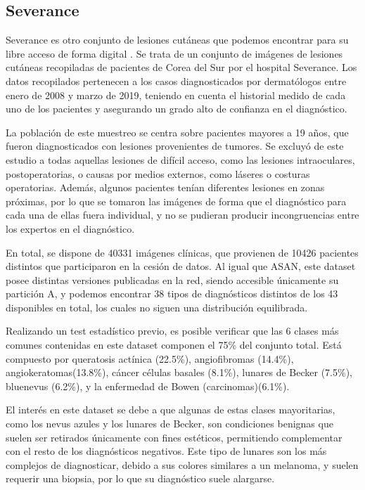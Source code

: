 \subsection{Severance}

Severance es otro conjunto de lesiones cutáneas que podemos encontrar para su libre acceso de forma digital \cite{severance}. Se trata de un conjunto de imágenes de lesiones cutáneas recopiladas de pacientes de Corea del Sur por el hospital Severance.  Los datos recopilados pertenecen a los casos diagnosticados por dermatólogos entre enero de 2008 y marzo de 2019, teniendo en cuenta el historial medido de cada uno de los pacientes y asegurando un grado alto de confianza en el diagnóstico.

La población de este muestreo se centra sobre pacientes mayores a 19 años, que fueron diagnosticados con lesiones provenientes de tumores. Se excluyó de este estudio a todas aquellas lesiones de difícil acceso, como las lesiones intraoculares, postoperatorias, o causas por medios externos, como láseres o costuras operatorias. Además, algunos pacientes tenían diferentes lesiones en zonas próximas, por lo que se tomaron las imágenes de forma que el diagnóstico para cada una de ellas fuera individual, y no se pudieran producir incongruencias entre los expertos en el diagnóstico. 

En total, se dispone de 40331 imágenes clínicas, que provienen de 10426 pacientes distintos que participaron en la cesión de datos. Al igual que ASAN, este dataset posee distintas versiones publicadas en la red, siendo accesible únicamente su partición A, y podemos encontrar 38 tipos de diagnósticos distintos de los 43 disponibles en total,  los cuales no siguen una distribución equilibrada.

Realizando un test estadístico previo, es posible verificar que las 6 clases más comunes contenidas en este dataset componen el 75\% del conjunto total. Está compuesto por queratosis actínica (22.5\%), angiofibromas (14.4\%), angiokeratomas(13.8\%), cáncer células basales (8.1\%), lunares de Becker (7.5\%), bluenevus (6.2\%), y la enfermedad de Bowen (carcinomas)(6.1\%).

El interés en este dataset se debe a que algunas de estas clases mayoritarias, como los nevus azules y los lunares de Becker, son condiciones benignas que suelen ser retirados únicamente con fines estéticos, permitiendo complementar con el resto de los diagnósticos negativos. Este tipo de lunares son los más complejos de diagnosticar, debido a sus colores similares a un melanoma, y suelen requerir una biopsia, por lo que su diagnóstico suele alargarse.

